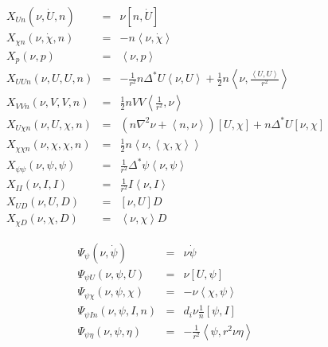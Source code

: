 \documentclass[letterpaper]{book}
\newcommand{\gs}[1]{\Delta^* #1}
\newcommand{\lp}[1]{\nabla^2 #1}
\newcommand{\pb}[2]{\left[#1,#2\right]}
\newcommand{\ip}[2]{\left\langle  #1,#2\right\rangle}
\begin{document}
\begin{equation}
  \begin{array}{lcl}
    X_{U n}(\nu, \dot U, n) & = & \nu \pb{n}{\dot{U}}
    \\
    X_{\chi n}(\nu, \dot \chi, n) & = & -n \ip{\nu}{\dot{\chi}}
    \\
    X_p(\nu, p) & = & \ip{\nu}{p}
    \\
    X_{U U n}(\nu, U, U, n) & = & -\frac{1}{r^2} n \gs{U} \ip{\nu}{U}
      + \frac{1}{2} n \ip{\nu}{\frac{\ip{U}{U}}{r^2}}
    \\
    X_{V V n}(\nu, V,  V, n) & = & 
      \frac{1}{2} n V V \ip{\frac{1}{r^2}}{\nu}
    \\
    X_{U \chi n}(\nu, U, \chi, n) & = & 
      \left( n \lp{\nu} + \ip{n}{\nu} \right) \pb{U}{\chi}
      + n \gs{U} \pb{\nu}{\chi}
    \\
    X_{\chi \chi n}(\nu, \chi, \chi, n) & = & \frac{1}{2} n 
      \ip{\nu}{\ip{\chi}{\chi}}
    \\
    X_{\psi \psi}(\nu, \psi, \psi) & = & 
      \frac{1}{r^2} \gs{\psi} \ip{\nu}{\psi}
    \\
    X_{I I}(\nu, I, I) & = & \frac{1}{r^2} I \ip{\nu}{I}
    \\
    X_{U D}(\nu, U, D) & = & \pb{\nu}{U} D
    \\
    X_{\chi D}(\nu, \chi, D) & = & \ip{\nu}{\chi} D
  \end{array}
\end{equation}


\begin{equation}
  \begin{array}{lcl}
    \Psi_{\psi}(\nu, \dot{\psi}) & = & \nu \dot{\psi}\\
    \Psi_{\psi U}(\nu, \psi, U) & = & \nu \pb{U}{\psi}\\
    \Psi_{\psi \chi}(\nu, \psi, \chi) & = & -\nu \ip{\chi}{\psi}\\
    \Psi_{\psi I n}(\nu, \psi, I, n) & = & d_i \nu \frac{1}{n} \pb{\psi}{I}\\
    \Psi_{\psi \eta}(\nu, \psi, \eta) & = & 
        -\frac{1}{r^2} \ip{\psi}{r^2 \nu \eta} 
  \end{array}
\end{equation}
\end{document}
